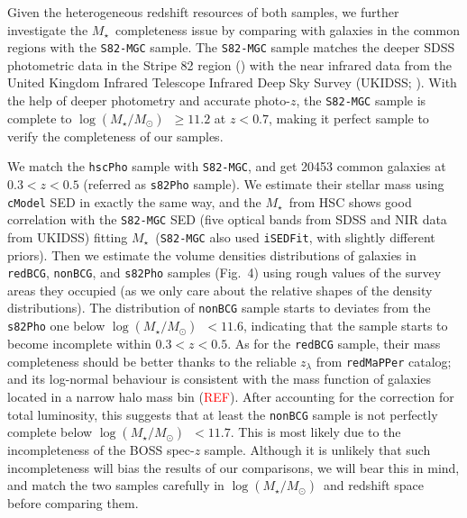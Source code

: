 \documentclass[preprint]{aastex}
\def\redm{\texttt{redMaPPer}}
\def\logms{{$\log (M_{\star}/M_{\odot})$}~}
\def\mstar{{$M_{\star}$}~}
\newcommand{\addref}{{\textcolor{red}{REF}}}
\begin{document}
\begin{CJK*}{UTF8}{gbsn}
    Given the heterogeneous redshift resources of both samples, we further 
    investigate the \mstar completeness issue by comparing with galaxies in the 
    common regions with the \texttt{S82-MGC} sample. 
    The \texttt{S82-MGC} sample matches the deeper SDSS photometric data in the 
    Stripe 82 region (\citealt{Annis2014}) with the near infrared data from the 
    United Kingdom Infrared Telescope Infrared Deep Sky Survey (UKIDSS; 
    \citealt{Lawrence2007}). 
    With the help of deeper photometry and accurate photo-$z$, the \texttt{S82-MGC}
    sample is complete to \logms$\geq 11.2$ at $z<0.7$, making it perfect sample
    to verify the completeness of our samples.  
    
    We match the \texttt{hscPho} sample with \texttt{S82-MGC}, and get 20453 
    common galaxies at $0.3 < z < 0.5$ (referred as \texttt{s82Pho} sample).  
    We estimate their stellar mass using \texttt{cModel} SED in exactly the same
    way, and the \mstar from HSC shows good correlation with the 
    \texttt{S82-MGC} SED (five optical bands from SDSS and NIR data from UKIDSS)
    fitting \mstar (\texttt{S82-MGC} also used \texttt{iSEDFit}, with slightly 
    different priors).  
    Then we estimate the volume densities distributions of galaxies in 
    \texttt{redBCG}, \texttt{nonBCG}, and \texttt{s82Pho} samples (Fig.~4)
    using rough values of the survey areas they occupied 
    (as we only care about the relative shapes of the density distributions). 
    The distribution of \texttt{nonBCG} sample starts to deviates from the 
    \texttt{s82Pho} one below \logms$< 11.6$, indicating that the sample starts 
    to become incomplete within $0.3 < z < 0.5$. 
    As for the \texttt{redBCG} sample, their mass completeness should be better 
    thanks to the reliable $z_{\lambda}$ from \redm{} catalog; and its log-normal 
    behaviour is consistent with the mass function of galaxies located in a 
    narrow halo mass bin (\addref).   
    After accounting for the correction for total luminosity, this suggests that
    at least the \texttt{nonBCG} sample is not perfectly complete below 
    \logms$< 11.7$.  
    This is most likely due to the incompleteness of the BOSS spec-$z$ sample.
    Although it is unlikely that such incompleteness will bias the results of 
    our comparisons, we will bear this in mind, and match the two samples 
    carefully in \logms and redshift space before comparing them.


\end{CJK*}
\end{document}
